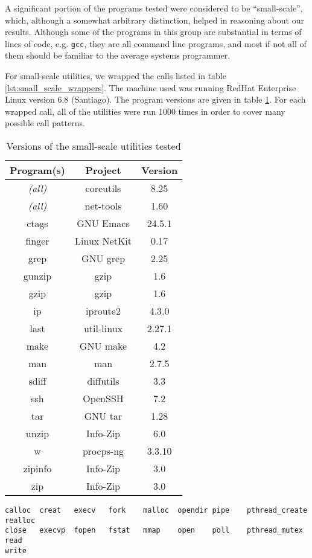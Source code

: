 A significant portion of the programs tested were considered to be ``small-scale'', which, although a somewhat arbitrary distinction, helped in reasoning about our results. Although some of the programs in this group are substantial in terms of lines of code, e.g. \texttt{gcc}, they are all command line programs, and most if not all of them should be familiar to the average systems programmer.

For small-scale utilities, we wrapped the calls listed in table \ref{lst:small_scale_wrappers}. The machine used was running RedHat Enterprise Linux version 6.8 (Santiago). The program versions are given in table \ref{tab:small_scale_versions}. For each wrapped call, all of the utilities were run 1000 times in order to cover many possible call patterns.

\begin{table}[h!]
\begin{center}
\begin{tabular}{ |c|c|c| }
\hline
\multicolumn{1}{|c|}{\textbf{Program(s)}} & \multicolumn{1}{|c|}{\textbf{Project}} & \multicolumn{1}{c|}{\textbf{Version}} \\
\hline
\em{(all)} & coreutils  & 8.25 \\ 
\hline
\em{(all)} & net-tools & 1.60 \\
\hline
ctags&GNU Emacs & 24.5.1 \\
finger&Linux NetKit  & 0.17 \\
grep & GNU grep & 2.25 \\
gunzip & gzip & 1.6 \\
gzip & gzip & 1.6 \\
ip&iproute2 & 4.3.0 \\
last & util-linux & 2.27.1 \\
make & GNU make & 4.2 \\
man & man & 2.7.5 \\
sdiff&diffutils & 3.3 \\
ssh&OpenSSH & 7.2 \\
tar&GNU tar & 1.28 \\
unzip&Info-Zip  & 6.0 \\
w&procps-ng & 3.3.10 \\
zipinfo&Info-Zip & 3.0 \\
zip&Info-Zip & 3.0 \\
\hline
\end{tabular}
\caption{Versions of the small-scale utilities tested}
\label{tab:small_scale_versions}
\end{center}
\end{table}

\PreTable
\begin{lstlisting}[captionpos=b, label={lst:small_scale_wrappers},caption={Wrapped calls for testing small-scale utilities}]
calloc  creat   execv   fork    malloc  opendir pipe    pthread_create 	realloc
close   execvp  fopen   fstat   mmap    open    poll    pthread_mutex	read    
write
\end{lstlisting}
\PostTable
